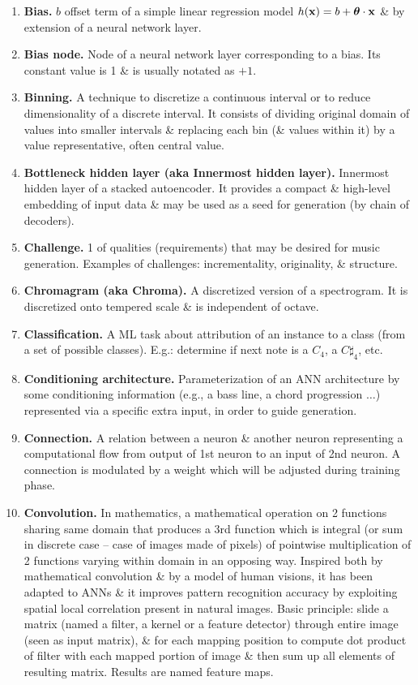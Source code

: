 \documentclass{article}
\begin{document}
\begin{itemize}
\begin{enumerate}
		\item {\bf Bias.} $b$ offset term of a simple linear regression model $h({\bf x}) = b + \boldsymbol{\theta}\cdot{\bf x}$ \& by extension of a neural network layer.
		\item {\bf Bias node.} Node of a neural network layer corresponding to a bias. Its constant value is 1 \& is usually notated as $+1$.
		\item {\bf Binning.} A technique to discretize a continuous interval or to reduce dimensionality of a discrete interval. It consists of dividing original domain of values into smaller intervals \& replacing each bin (\& values within it) by a value representative, often central value.
		\item {\bf Bottleneck hidden layer (aka Innermost hidden layer).} Innermost hidden layer of a stacked autoencoder. It provides a compact \& high-level embedding of input data \& may be used as a seed for generation (by chain of decoders).
		\item {\bf Challenge.} 1 of qualities (requirements) that may be desired for music generation. Examples of challenges: incrementality, originality, \& structure.
		\item {\bf Chromagram (aka Chroma).} A discretized version of a spectrogram. It is discretized onto tempered scale \& is independent of octave.
		\item {\bf Classification.} A ML task about attribution of an instance to a class (from a set of possible classes). E.g.: determine if next note is a $C_4$, a $C\sharp_4$, etc.
		\item {\bf Conditioning architecture.} Parameterization of an ANN architecture by some conditioning information (e.g., a bass line, a chord progression $\ldots$) represented via a specific extra input, in order to guide generation.
		\item {\bf Connection.} A relation between a neuron \& another neuron representing a computational flow from output of 1st neuron to an input of 2nd neuron. A connection is modulated by a weight which will be adjusted during training phase.
		\item {\bf Convolution.} In mathematics, a mathematical operation on 2 functions sharing same domain that produces a 3rd function which is integral (or sum in discrete case -- case of images made of pixels) of pointwise multiplication of 2 functions varying within domain in an opposing way. Inspired both by mathematical convolution \& by a model of human visions, it has been adapted to ANNs \& it improves pattern recognition accuracy by exploiting spatial local correlation present in natural images. Basic principle: slide a matrix (named a filter, a kernel or a feature detector) through entire image (seen as input matrix), \& for each mapping position to compute dot product of filter with each mapped portion of image \& then sum up all elements of resulting matrix. Results are named feature maps.

\end{enumerate}
\end{itemize}
\end{document}
